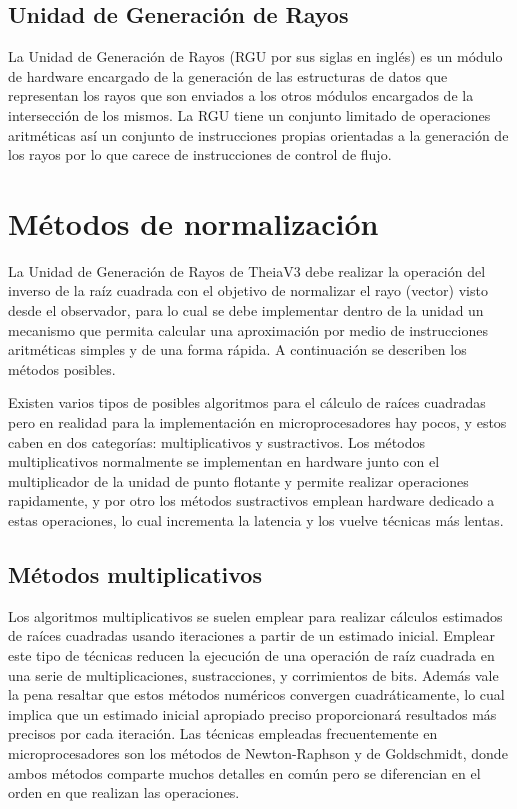 \subsection{Unidad de Generación de Rayos}

La Unidad de Generación de Rayos (RGU por sus siglas en inglés) es un módulo de hardware encargado de la generación de las estructuras de datos que representan los rayos que son enviados a los otros módulos encargados de la intersección de los mismos. La RGU tiene un conjunto limitado de operaciones aritméticas así un conjunto de instrucciones propias orientadas a la generación de los rayos por lo que carece de instrucciones de control de flujo.  

\section{Métodos de normalización}

La Unidad de Generación de Rayos de TheiaV3 debe realizar la operación del inverso de la raíz cuadrada con el objetivo de normalizar el rayo (vector) visto desde el observador, para lo cual se debe implementar dentro de
la unidad un mecanismo que permita calcular una aproximación por medio de instrucciones aritméticas simples y de una forma rápida.  A continuación se describen los métodos posibles. 

Existen varios tipos de posibles algoritmos para el cálculo de raíces cuadradas pero en realidad para la implementación en microprocesadores hay pocos, y estos caben en dos categorías: multiplicativos y sustractivos. Los métodos multiplicativos normalmente se implementan en hardware junto con el multiplicador de la unidad de punto flotante y permite realizar operaciones rapidamente, y por otro los métodos sustractivos emplean hardware dedicado a estas operaciones, lo cual incrementa la latencia y los vuelve técnicas más lentas.   

\subsection{Métodos multiplicativos}

Los algoritmos multiplicativos se suelen emplear para realizar cálculos estimados de raíces cuadradas usando iteraciones a partir de un estimado inicial. Emplear este tipo de técnicas reducen la ejecución de una operación de raíz cuadrada en una serie de multiplicaciones, sustracciones, y corrimientos de bits. Además vale la pena resaltar que estos métodos numéricos convergen cuadráticamente, lo cual implica que un estimado inicial apropiado preciso proporcionará resultados más precisos por cada iteración. Las técnicas empleadas frecuentemente en microprocesadores son los métodos de Newton-Raphson y de Goldschmidt, donde ambos métodos comparte muchos detalles en común pero se diferencian en el orden en que realizan las operaciones.

